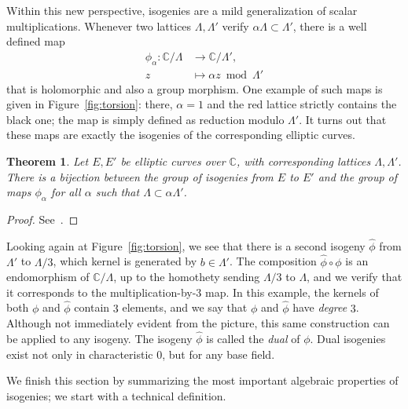 \documentclass[10pt]{article}
\theoremstyle{plain}
\newtheorem{theorem}{Theorem}
\theoremstyle{definition}
\begin{document}
Within this new perspective, isogenies are a mild generalization of
scalar multiplications. %
Whenever two lattices $Λ,Λ'$ verify $αΛ⊂Λ'$, there is a well defined
map
\begin{align*}
   ϕ_α : ℂ/Λ &\to ℂ/Λ',\\
  z &\mapsto αz \bmod Λ'
\end{align*}
that is holomorphic and also a group morphism. %
One example of such maps is given in Figure~\ref{fig:torsion}: there,
$α=1$ and the red lattice strictly contains the black one; the map is
simply defined as reduction modulo $Λ'$. %
It turns out that these maps are exactly the isogenies of the
corresponding elliptic curves.

\begin{theorem}
  Let $E,E'$ be elliptic curves over $ℂ$, with corresponding lattices
  $Λ,Λ'$. %
  There is a bijection between the group of isogenies from $E$ to $E'$
  and the group of maps $ϕ_α$ for all $α$ such that $Λ⊂αΛ'$.
\end{theorem}
\begin{proof}
  See~\cite[VI, Th.~4.1]{silverman:elliptic}.
\end{proof}

Looking again at Figure~\ref{fig:torsion}, we see that there is a
second isogeny $\hat{ϕ}$ from $Λ'$ to $Λ/3$, which kernel is generated
by $b∈Λ'$. %
The composition $\hat{ϕ}∘ϕ$ is an endomorphism of $ℂ/Λ$, up to the
homothety sending $Λ/3$ to $Λ$, and we verify that it corresponds to
the multiplication-by-$3$ map. %
In this example, the kernels of both $ϕ$ and $\hat{ϕ}$ contain $3$
elements, and we say that $ϕ$ and $\hat{ϕ}$ have \emph{degree} $3$. %
Although not immediately evident from the picture, this same
construction can be applied to any isogeny. %
The isogeny $\hat{ϕ}$ is called the \emph{dual} of $ϕ$. %
Dual isogenies exist not only in characteristic $0$, but for any base
field. %

We finish this section by summarizing the most important algebraic
properties of isogenies; we start with a technical definition.
\end{document}
